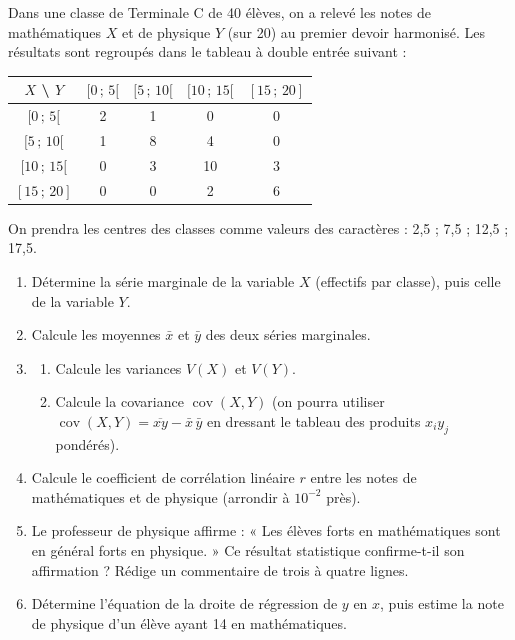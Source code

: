 \documentclass[11pt]{article}
\begin{document}
\begin{exercice}\label{exo:bac-notes}
Dans une classe de Terminale C de 40 élèves, on a relevé les notes de mathématiques $X$ et de physique $Y$ (sur 20) au premier devoir harmonisé. Les résultats sont regroupés dans le tableau à double entrée suivant :

\begin{center}
\begin{tabular}{|c|c|c|c|c|}
\hline
\rowcolor{popblueL} $X$ \textbackslash{} $Y$ & $[0\,;\,5[$ & $[5\,;\,10[$ & $[10\,;\,15[$ & $[15\,;\,20]$ \\
\hline
$[0\,;\,5[$ & 2 & 1 & 0 & 0 \\
\hline
$[5\,;\,10[$ & 1 & 8 & 4 & 0 \\
\hline
$[10\,;\,15[$ & 0 & 3 & 10 & 3 \\
\hline
$[15\,;\,20]$ & 0 & 0 & 2 & 6 \\
\hline
\end{tabular}
\end{center}

On prendra les centres des classes comme valeurs des caractères : 2,5 ; 7,5 ; 12,5 ; 17,5.

\begin{enumerate}
\item Détermine la série marginale de la variable $X$ (effectifs par classe), puis celle de la variable $Y$.
\item Calcule les moyennes $\bar{x}$ et $\bar{y}$ des deux séries marginales.
\item \begin{enumerate}
\item Calcule les variances $V(X)$ et $V(Y)$.
\item Calcule la covariance $\operatorname{cov}(X,Y)$ (on pourra utiliser $\operatorname{cov}(X,Y)=\overline{xy}-\bar{x}\,\bar{y}$ en dressant le tableau des produits $x_iy_j$ pondérés).
\end{enumerate}
\item Calcule le coefficient de corrélation linéaire $r$ entre les notes de mathématiques et de physique (arrondir à $10^{-2}$ près).
\item Le professeur de physique affirme : « Les élèves forts en mathématiques sont en général forts en physique. » Ce résultat statistique confirme-t-il son affirmation ? Rédige un commentaire de trois à quatre lignes.
\item Détermine l'équation de la droite de régression de $y$ en $x$, puis estime la note de physique d'un élève ayant 14 en mathématiques.
\end{enumerate}
\end{exercice}
\end{document}
